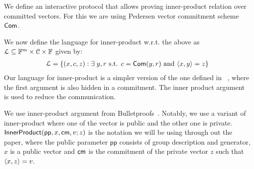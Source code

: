 We define an interactive protocol that allows proving inner-product relation over committed vectors. For this we are using Pedersen vector commitment scheme $\mathsf{Com}$.

We now define the language for inner-product w.r.t. the above  as $\mathcal{L} \subseteq \mathbb{F}^m \times \mathcal{C} \times \mathbb{F}$ given by:
\begin{equation*}
\begin{array}{l}
\mathcal{L} = \{(x,c,z):\exists \; y,r \text{ s.t. } 
c=\mathsf{Com}(y,r)  \text{ and } \langle x,y\rangle=z\} 
\end{array}
\end{equation*}
Our language for inner-product is a simpler version of the one defined in ~\cite{bulletproofs}, where the first argument is also hidden in a commitment. The inner product argument is used to reduce the communication.

We use inner-product argument from Bulletproofs~\cite{bulletproofs}. Notably, we use a variant of inner-product where one of the vector is public and the other one is private. $\mathsf{InnerProduct}(\mathsf{pp}, x, \mathsf{cm}, v ; z)$ is the notation we will be using through out the paper, where the public parameter $\mathsf{pp}$  consists of group description and generator, $x$ is a public vector and $\mathsf{cm}$ is the commitment of the private vector $z$ such that $\langle x,z\rangle = v$.




